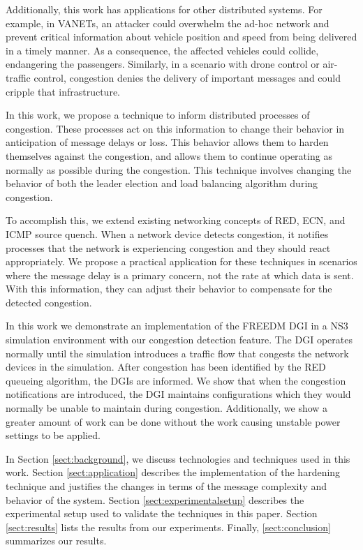 Additionally, this work has applications for other distributed systems.
For example, in \ac{VANET}s\cite{CARS1}\cite{CARS2}, an attacker could overwhelm the ad-hoc network and prevent critical information about vehicle position and speed from being delivered in a timely manner.
As a consequence, the affected vehicles could collide, endangering the passengers.
Similarly, in a scenario with drone control or air-traffic control\cite{AIRTRAFFIC1}\cite{AIRTRAFFIC2}, congestion denies the delivery of important messages and could cripple that infrastructure.

In this work, we propose a technique to inform distributed processes of congestion.
These processes act on this information to change their behavior in anticipation of message delays or loss.
This behavior allows them to harden themselves against the congestion, and allows them to continue operating as normally as possible during the congestion.
This technique involves changing the behavior of both the leader election\cite{INVITATIONELECTION} and load balancing algorithm during congestion.

To accomplish this, we extend existing networking concepts of \ac{RED}, \ac{ECN}\cite{RFCECN}, and ICMP source quench\cite{RFCSOURCEQUENCH}.
When a network device detects congestion, it notifies processes that the network is experiencing congestion and they should react appropriately.
We propose a practical application for these techniques in scenarios where the message delay is a primary concern, not the rate at which data is sent.
With this information, they can adjust their behavior to compensate for the detected congestion.

In this work we demonstrate an implementation of the \ac{FREEDM} \ac{DGI} in a \ac{NS3} simulation environment\cite{NS3} with our congestion detection feature.
The \ac{DGI} operates normally until the simulation introduces a traffic flow that congests the network devices in the simulation.
After congestion has been identified by the \ac{RED} queueing algorithm, the \ac{DGI}s are informed. %
We show that when the congestion notifications are introduced, the \ac{DGI} maintains configurations which they would normally be unable to maintain during congestion.
Additionally, we show a greater amount of work can be done without the work causing unstable power settings to be applied.

In Section \ref{sect:background}, we discuss technologies and techniques used in this work.
Section \ref{sect:application} describes the implementation of the hardening technique and justifies the changes in terms of the message complexity and behavior of the system.
Section \ref{sect:experimentalsetup} describes the experimental setup used to validate the techniques in this paper.
Section \ref{sect:results} lists the results from our experiments.
Finally, \ref{sect:conclusion} summarizes our results.
